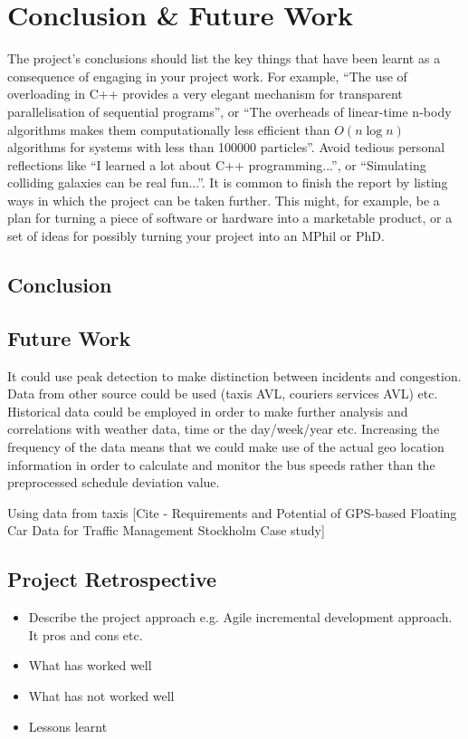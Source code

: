 \chapter{Conclusion \& Future Work}

The project's conclusions should list the key things that have been learnt as a consequence of engaging in your project work. For example, ``The use of overloading in C++ provides a very elegant mechanism for transparent parallelisation of sequential programs'', or ``The overheads of linear-time n-body algorithms makes them computationally less efficient than $O(n \log n)$ algorithms for systems with less than 100000 particles''. Avoid tedious personal reflections like ``I learned a lot about C++ programming...'', or ``Simulating colliding galaxies can be real fun...''. It is common to finish the report by listing ways in which the project can be taken further. This might, for example, be a plan for turning a piece of software or hardware into a marketable product, or a set of ideas for possibly turning your project into an MPhil or PhD.

\section{Conclusion}

\section{Future Work}
It could use peak detection to make distinction between incidents and congestion.
Data from other source could be used (taxis AVL, couriers services AVL) etc.
Historical data could be employed in order to make further analysis and correlations with weather data, time or the day/week/year etc.
Increasing the frequency of the data means that we could make use of the actual geo location information in order to calculate and monitor the bus speeds rather than the preprocessed schedule deviation value.

Using data from taxis [Cite - Requirements and Potential of GPS-based Floating Car Data for Traffic Management Stockholm Case study]

\section{Project Retrospective}
\begin{itemize}
	\item Describe the project approach e.g. Agile incremental development approach. It pros and cons etc. 
	\item What has worked well
	\item What has not worked well
	\item Lessons learnt
\end{itemize}

